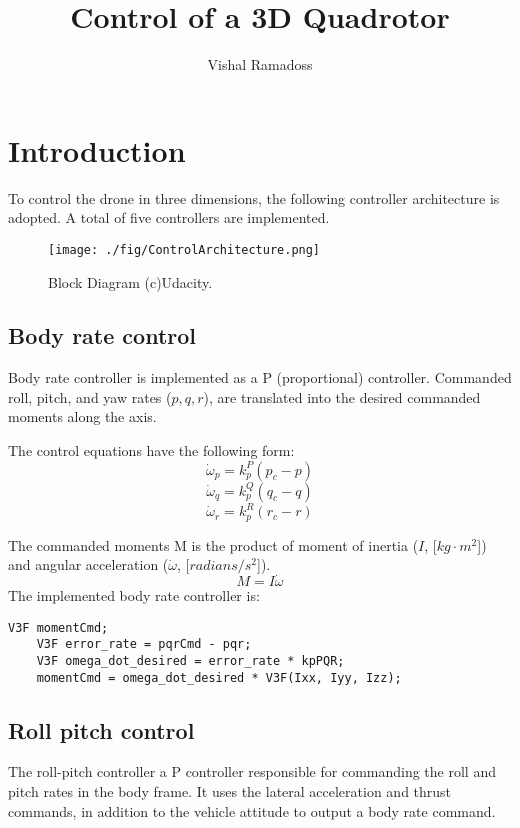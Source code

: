 \documentclass[letterpaper]{article}
\title{Control of a 3D Quadrotor}
\author{Vishal Ramadoss }
\begin{document}
\maketitle

\section{Introduction}

To control the drone in three dimensions, the following controller architecture is adopted. A total of five controllers are implemented.

\begin{figure}[ht]
\centering
\texttt{[image: ./fig/ControlArchitecture.png]}
\caption{\label{fig:controller} Block Diagram (c)Udacity.}
\end{figure}


\subsection{Body rate control} \label{control:bodyrate}

Body rate controller is implemented as a P (proportional) controller. Commanded roll, pitch, and yaw rates ($p, q, r$), are translated into the desired commanded moments along the axis. 

The control equations have the following form:
$$ \dot{\omega}_{p} = k_{p}^{P} (p_c - p) $$
$$ \dot{\omega}_{q} = k_{p}^{Q} (q_c - q) $$
$$ \dot{\omega}_{r} = k_{p}^{R} (r_c - r) $$

The commanded moments M is the product of moment of inertia ($I$, [$kg \cdot m^2$]) and angular acceleration ($\dot{\omega}$, [$radians/s^2$]).
$$ M = I \dot{\omega} $$
The implemented body rate controller is:

\begin{lstlisting}[frame=single]
    V3F momentCmd;
    V3F error_rate = pqrCmd - pqr;
    V3F omega_dot_desired = error_rate * kpPQR;
    momentCmd = omega_dot_desired * V3F(Ixx, Iyy, Izz);
\end{lstlisting}

\subsection{Roll pitch control} \label{control:rollpitch}
The roll-pitch controller a P controller responsible for commanding the roll and pitch rates in the body frame. It uses the lateral acceleration and thrust commands, in addition to the vehicle attitude to output a body rate command. 
\end{document}
